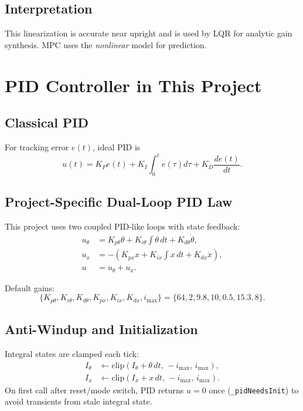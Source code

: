 \documentclass[11pt,a4paper]{article}
\begin{document}
\subsection{Interpretation}
This linearization is accurate near upright and is used by LQR for analytic gain synthesis. MPC uses the \emph{nonlinear} model for prediction.

\section{PID Controller in This Project}
\subsection{Classical PID}
For tracking error $e(t)$, ideal PID is
\begin{equation}
u(t)=K_P e(t)+K_I\int_0^t e(\tau)d\tau + K_D\frac{de(t)}{dt}.
\end{equation}

\subsection{Project-Specific Dual-Loop PID Law}
This project uses two coupled PID-like loops with state feedback:
\begin{align}
u_\theta &= K_{p\theta}\theta + K_{i\theta}\!\int\theta\,dt + K_{d\theta}\dot{\theta},\\
u_x &= -\left(K_{px}x + K_{ix}\!\int x\,dt + K_{dx}\dot{x}\right),\\
u &= u_\theta + u_x.
\end{align}

Default gains:
\begin{equation}
\{K_{p\theta},K_{i\theta},K_{d\theta},K_{px},K_{ix},K_{dx},i_{\max}\}
=\{64,2,9.8,10,0.5,15.3,8\}.
\end{equation}

\subsection{Anti-Windup and Initialization}
Integral states are clamped each tick:
\begin{align}
I_\theta &\leftarrow \text{clip}(I_\theta + \theta\,dt,\,-i_{\max},\,i_{\max}),\\
I_x &\leftarrow \text{clip}(I_x + x\,dt,\,-i_{\max},\,i_{\max}).
\end{align}
On first call after reset/mode switch, PID returns $u=0$ once (\texttt{\_pidNeedsInit}) to avoid transients from stale integral state.
\end{document}
